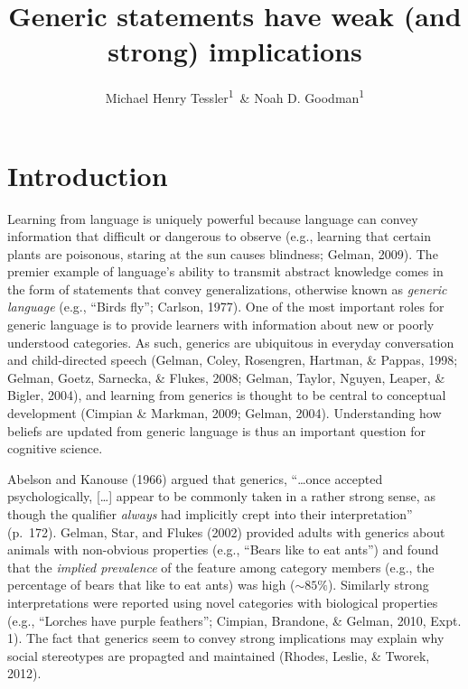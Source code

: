 \documentclass[floatsintext,man]{apa6}
\title{Generic statements have weak (and strong) implications}
\author{Michael Henry Tessler\textsuperscript{1}~\& Noah D. Goodman\textsuperscript{1}}
\affiliation{
    \vspace{0.5cm}
          \textsuperscript{1} Department of Psychology, Stanford University  }
\theoremstyle{definition}
\theoremstyle{definition}
\theoremstyle{definition}
\theoremstyle{remark}
\begin{document}
\maketitle

\setcounter{secnumdepth}{0}



\newcommand{\denote}[1]{\mbox{ $[\![ #1 ]\!]$}}
\newcommand*\diff{\mathop{}\!\mathrm{d}}

 

\newcommand{\mht}[1]{{\textcolor{Blue}{[mht: #1]}}}
\newcommand{\ndg}[1]{{\textcolor{Green}{[ndg: #1]}}}
\newcommand{\red}[1]{{\textcolor{Red}{#1}}}







\section{Introduction}\label{introduction}

Learning from language is uniquely powerful because language can convey
information that difficult or dangerous to observe (e.g., learning that
certain plants are poisonous, staring at the sun causes blindness;
Gelman, 2009). The premier example of language's ability to transmit
abstract knowledge comes in the form of statements that convey
generalizations, otherwise known as \emph{generic language} (e.g.,
``Birds fly''; Carlson, 1977). One of the most important roles for
generic language is to provide learners with information about new or
poorly understood categories. As such, generics are ubiquitous in
everyday conversation and child-directed speech (Gelman, Coley,
Rosengren, Hartman, \& Pappas, 1998; Gelman, Goetz, Sarnecka, \& Flukes,
2008; Gelman, Taylor, Nguyen, Leaper, \& Bigler, 2004), and learning
from generics is thought to be central to conceptual development
(Cimpian \& Markman, 2009; Gelman, 2004). Understanding how beliefs are
updated from generic language is thus an important question for
cognitive science.

Abelson and Kanouse (1966) argued that generics, \enquote{\ldots{}once
accepted psychologically, {[}\ldots{}{]} appear to be commonly taken in
a rather strong sense, as though the qualifier \emph{always} had
implicitly crept into their interpretation} (p.~172). Gelman, Star, and
Flukes (2002) provided adults with generics about animals with
non-obvious properties (e.g., \enquote{Bears like to eat ants}) and
found that the \emph{implied prevalence} of the feature among category
members (e.g., the percentage of bears that like to eat ants) was high
(\(\sim 85\%\)). Similarly strong interpretations were reported using
novel categories with biological properties (e.g., ``Lorches have purple
feathers''; Cimpian, Brandone, \& Gelman, 2010, Expt. 1). The fact that
generics seem to convey strong implications may explain why social
stereotypes are propagted and maintained (Rhodes, Leslie, \& Tworek,
2012).
\end{document}
